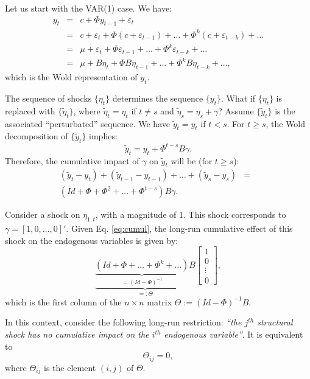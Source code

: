 \documentclass[
  12pt,
]{book}
\theoremstyle{definition}
\theoremstyle{definition}
\theoremstyle{definition}
\theoremstyle{definition}
\theoremstyle{remark}
\begin{document}
Let us start with the VAR(1) case. We have:
\begin{eqnarray*}
y_{t} &=& c+\Phi y_{t-1}+\varepsilon_{t}\\
& = & c+\varepsilon_{t}+\Phi(c+\varepsilon_{t-1})+\ldots+\Phi^{k}(c+\varepsilon_{t-k})+\ldots \\
& = & \mu +\varepsilon_{t}+\Phi\varepsilon_{t-1}+\ldots+\Phi^{k}\varepsilon_{t-k}+\ldots \\
& = & \mu +B\eta_{t}+\Phi B\eta_{t-1}+\ldots+\Phi^{k}B\eta_{t-k}+\ldots,
\end{eqnarray*}
which is the Wold representation of \(y_t\).

The sequence of shocks \(\{\eta_t\}\) determines the sequence \(\{y_t\}\). What if \(\{\eta_t\}\) is replaced with \(\{\tilde{\eta}_t\}\), where \(\tilde{\eta}_t=\eta_t\) if \(t \ne s\) and \(\tilde{\eta}_s=\eta_s + \gamma\)? Assume \(\{\tilde{y}_t\}\) is the associated ``perturbated'' sequence. We have \(\tilde{y}_t = y_t\) if \(t<s\). For \(t \ge s\), the Wold decomposition of \(\{\tilde{y}_t\}\) implies:
\[
\tilde{y}_t = y_t + \Phi^{t-s} B \gamma.
\]
Therefore, the cumulative impact of \(\gamma\) on \(\tilde{y}_t\) will be (for \(t \ge s\)):
\begin{eqnarray}
(\tilde{y}_t - y_t) +  (\tilde{y}_{t-1} - y_{t-1}) + \dots +  (\tilde{y}_s - y_s) &=& \nonumber \\
(Id + \Phi + \Phi^2 + \dots + \Phi^{t-s}) B \gamma.&& \label{eq:cumul}
\end{eqnarray}

Consider a shock on \(\eta_{1,t}\), with a magnitude of \(1\). This shock corresponds to \(\gamma = [1,0,\dots,0]'\). Given Eq. \eqref{eq:cumul}, the long-run cumulative effect of this shock on the endogenous variables is given by:
\[
\underbrace{\underbrace{(Id+\Phi+\ldots+\Phi^{k}+\ldots)}_{=(Id - \Phi)^{-1}}B}_{=: \Theta}\left[\begin{array}{c}
1\\
0\\
\vdots\\
0\end{array}\right],
\]
which is the first column of the \(n \times n\) matrix \(\Theta := (Id - \Phi)^{-1}B\).

In this context, consider the following long-run restriction: \emph{``the \(j^{th}\) structural shock has no cumulative impact on the \(i^{th}\) endogenous variable''}. It is equivalent to
\[
\Theta_{ij}=0,
\]
where \(\Theta_{ij}\) is the element \((i,j)\) of \(\Theta\).
\end{document}
